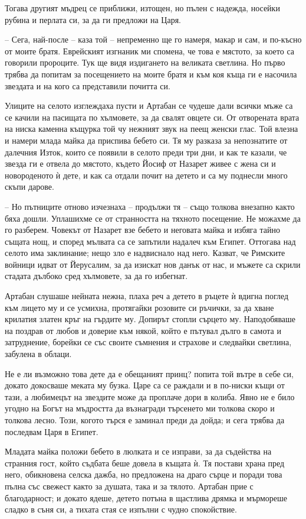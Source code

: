 Тогава другият мъдрец се приближи, изтощен, но пълен с надежда, носейки рубина и
перлата си, за да ги предложи на Царя.

-- Сега, най-после -- каза той -- непременно ще го намеря, макар и сам, и
по-късно от моите братя. Еврейският изгнаник ми спомена, че това е мястото, за
което са говорили пророците. Тук ще видя издигането на великата светлина. Но
първо трябва да попитам за посещението на моите братя и към коя къща ги е
насочила звездата и на кого са представили почитта си.

Улиците на селото изглеждаха пусти и Артабан се чудеше дали всички мъже са се
качили на пасищата по хълмовете, за да свалят овцете си. От отворената врата на
ниска каменна къщурка той чу нежният звук на пеещ женски глас. Той влезна и
намери млада майка да приспива бебето си. Тя му разказа за непознатите от
далечния Изток, които се появили в селото преди три дни, и как те казали, че
звезда ги е отвела до мястото, където Йосиф от Назарет живее с жена си и
новороденото ѝ дете, и как са отдали почит на детето и са му поднесли много
скъпи дарове.

-- Но пътниците отново изчезнаха -- продължи тя -- също толкова внезапно както
бяха дошли. Уплашихме се от странността на тяхното посещение. Не можахме да го
разберем. Човекът от Назарет взе бебето и неговата майка и избяга тайно същата
нощ, и според мълвата са се запътили надалеч към Египет. Оттогава над селото има
заклинание; нещо зло е надвиснало над него. Казват, че Римските войници идват от
Йерусалим, за да изискат нов данък от нас, и мъжете са скрили стадата дълбоко
сред хълмовете, за да го избегнат.

Артабан слушаше нейната нежна, плаха реч а детето в ръцете ѝ вдигна поглед към
лицето му и се усмихна, протягайки розовите си ръчички, за да хване крилатия
златен кръг на гърдите му. Допирът стопли сърцето му. Наподобяваше на поздрав от
любов и доверие към някой, който е пътувал дълго в самота и затруднение, борейки
се със своите съмнения и страхове и следвайки светлина, забулена в облаци.

Не е ли възможно това дете да е обещаният принц? попита той вътре в себе си,
докато докосваше меката му бузка. Царе са се раждали и в по-ниски къщи от
тази, а любимецът на звездите може да проплаче дори в колиба. Явно не е било
угодно на Богът на мъдростта да възнагради търсенето ми толкова скоро и толкова
лесно. Този, когото търся е заминал преди да дойда; и сега трябва да последвам
Царя в Египет.

Младата майка положи бебето в люлката и се изправи, за да съдейства на странния
гост, който съдбата беше довела в къщата ѝ. Тя постави храна пред него,
обикновена селска дажба, но предложена на драго сърце и поради това пълна със
свежест както за душата, така и за тялото. Артабан прие с благодарност; и докато
ядеше, детето потъна в щастлива дрямка и мърмореше сладко в съня си, а тихата
стая се изпълни с чудно спокойствие.

